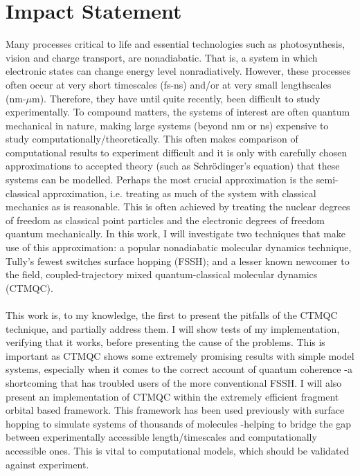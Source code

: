 \chapter*{Impact Statement}
Many processes critical to life and essential technologies such as photosynthesis, vision and charge transport, are nonadiabatic. That is, a system in which electronic states can change energy level nonradiatively. However, these processes often occur at very short timescales (fs-ns) and/or at very small lengthscales (nm-$\mu$m). Therefore, they have until quite recently, been difficult to study experimentally. To compound matters, the systems of interest are often quantum mechanical in nature, making large systems (beyond nm or ns) expensive to study computationally/theoretically. This often makes comparison of computational results to experiment difficult and it is only with carefully chosen approximations to accepted theory (such as Schr\"odinger's equation) that these systems can be modelled. Perhaps the most crucial approximation is the semi-classical approximation, i.e. treating as much of the system with classical mechanics as is reasonable. This is often achieved by treating the nuclear degrees of freedom as classical point particles and the electronic degrees of freedom quantum mechanically. In this work, I will investigate 
two techniques that make use of this approximation: a popular nonadiabatic molecular dynamics technique, Tully's fewest switches surface hopping (FSSH); and a lesser known newcomer to the field, coupled-trajectory mixed quantum-classical molecular dynamics (CTMQC).
\\\\
This work is, to my knowledge, the first to present the pitfalls of the CTMQC technique, and partially address them. I will show tests of my implementation, verifying that it works, before presenting the cause of the problems. This is important as CTMQC shows some extremely promising results with simple model systems, especially when it comes to the correct account of quantum coherence -a shortcoming that has troubled users of the more conventional FSSH. I will also present an implementation of CTMQC within the extremely efficient fragment orbital based framework. This framework has been used previously with surface hopping to simulate systems of thousands of molecules -helping to bridge the gap between experimentally accessible length/timescales and computationally accessible ones. This is vital to computational models, which should be validated against experiment.
\\\\
